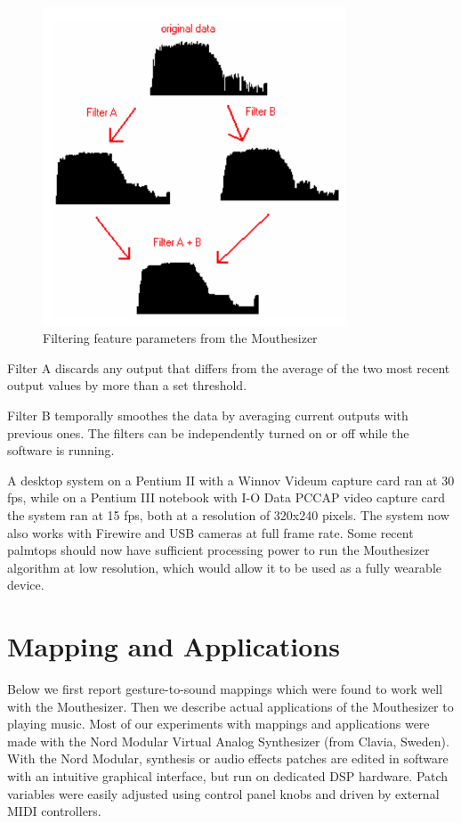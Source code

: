 \begin{figure}[t]
\centering
\includegraphics[width=90mm]{lyons_fig4}
\caption{Filtering feature parameters from the Mouthesizer}
\label{lyons-fig:4} 
\end{figure}

Filter A discards any output that differs from the average of the two most recent output values by more than a set threshold. 

Filter B temporally smoothes the data by averaging current outputs with previous ones. The filters can be independently turned on or off while the software is running.

A desktop system on a Pentium II with a Winnov Videum capture card ran at 30 fps, while on a Pentium III notebook with I-O Data PCCAP video capture card the system ran at 15 fps, both at a resolution of 320x240 pixels. The system now also works with Firewire and USB cameras at full frame rate. Some recent palmtops should now have sufficient processing power to run the Mouthesizer algorithm at low resolution, which would allow it to be used as a fully wearable device.

\section{Mapping and Applications}

Below we first report gesture-to-sound mappings which were found to work well with the Mouthesizer. Then we describe actual applications of the Mouthesizer to playing music. Most of our experiments with mappings and applications were made with the Nord Modular Virtual Analog Synthesizer (from Clavia, Sweden). With the Nord Modular, synthesis or audio effects patches are edited in software with an intuitive graphical interface, but run on dedicated DSP hardware. Patch variables were easily adjusted using control panel knobs and driven by external MIDI controllers.

